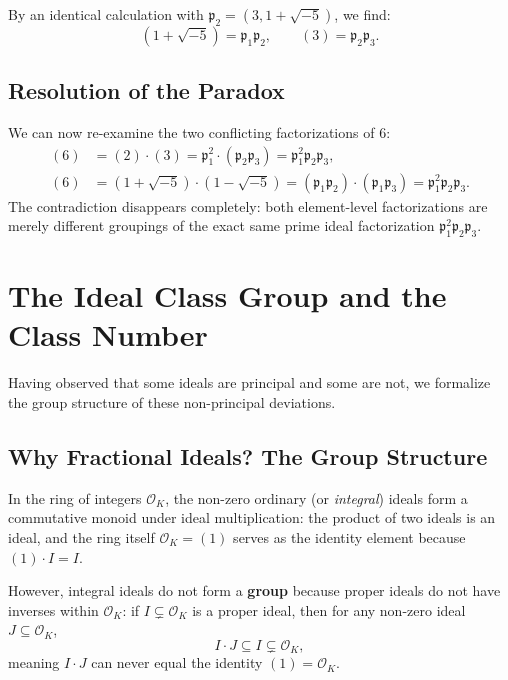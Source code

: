 \documentclass[a4paper]{article}
\begin{document}
By an identical calculation with $\mathfrak{p}_2 = (3, 1 + \sqrt{-5})$, we find:
\begin{equation}
 (1 + \sqrt{-5}) = \mathfrak{p}_1 \mathfrak{p}_2, \qquad (3) = \mathfrak{p}_2 \mathfrak{p}_3.
\end{equation}

\subsection{Resolution of the Paradox}
We can now re-examine the two conflicting factorizations of $6$:
\begin{align}
 (6) &= (2) \cdot (3) = \mathfrak{p}_1^2 \cdot (\mathfrak{p}_2 \mathfrak{p}_3) = \mathfrak{p}_1^2 \mathfrak{p}_2 \mathfrak{p}_3, \\
 (6) &= (1 + \sqrt{-5}) \cdot (1 - \sqrt{-5}) = (\mathfrak{p}_1 \mathfrak{p}_2) \cdot (\mathfrak{p}_1 \mathfrak{p}_3) = \mathfrak{p}_1^2 \mathfrak{p}_2 \mathfrak{p}_3.
\end{align}
The contradiction disappears completely: both element-level factorizations are merely different groupings of the exact same prime ideal factorization $\mathfrak{p}_1^2 \mathfrak{p}_2 \mathfrak{p}_3$.

\section{The Ideal Class Group and the Class Number}
\label{sec:class_group}
Having observed that some ideals are principal and some are not, we formalize the group structure of these non-principal deviations.

\subsection{Why Fractional Ideals? The Group Structure}
In the ring of integers $\mathcal{O}_K$, the non-zero ordinary (or \emph{integral}) ideals form a commutative monoid under ideal multiplication: the product of two ideals is an ideal, and the ring itself $\mathcal{O}_K = (1)$ serves as the identity element because $(1) \cdot I = I$.

However, integral ideals do not form a \textbf{group} because proper ideals do not have inverses within $\mathcal{O}_K$: if $I \subsetneq \mathcal{O}_K$ is a proper ideal, then for any non-zero ideal $J \subseteq \mathcal{O}_K$,
\begin{equation}
 I \cdot J \subseteq I \subsetneq \mathcal{O}_K,
\end{equation}
meaning $I \cdot J$ can never equal the identity $(1) = \mathcal{O}_K$. 
\end{document}
